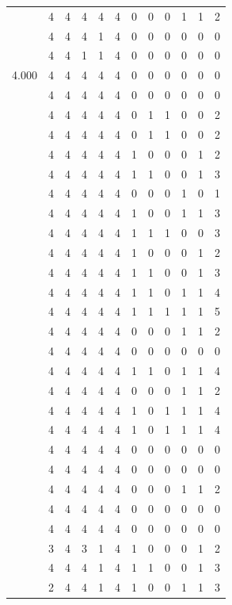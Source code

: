 \documentclass[]{msu-thesis}
\theoremstyle{definition}
\theoremstyle{definition}
\theoremstyle{definition}
\theoremstyle{remark}
\begin{document}
\begin{table}
{\begin{tabular}[t]{rrrrrrrrrrrr}
 & 4 & 4 & 4 & 4 & 4 & 0 & 0 & 0 & 1 & 1 & 2\\
 & 4 & 4 & 4 & 1 & 4 & 0 & 0 & 0 & 0 & 0 & 0\\
 & 4 & 4 & 1 & 1 & 4 & 0 & 0 & 0 & 0 & 0 & 0\\
4.000 & 4 & 4 & 4 & 4 & 4 & 0 & 0 & 0 & 0 & 0 & 0\\
 & 4 & 4 & 4 & 4 & 4 & 0 & 0 & 0 & 0 & 0 & 0\\
 & 4 & 4 & 4 & 4 & 4 & 0 & 1 & 1 & 0 & 0 & 2\\
 & 4 & 4 & 4 & 4 & 4 & 0 & 1 & 1 & 0 & 0 & 2\\
 & 4 & 4 & 4 & 4 & 4 & 1 & 0 & 0 & 0 & 1 & 2\\
 & 4 & 4 & 4 & 4 & 4 & 1 & 1 & 0 & 0 & 1 & 3\\
 & 4 & 4 & 4 & 4 & 4 & 0 & 0 & 0 & 1 & 0 & 1\\
 & 4 & 4 & 4 & 4 & 4 & 1 & 0 & 0 & 1 & 1 & 3\\
 & 4 & 4 & 4 & 4 & 4 & 1 & 1 & 1 & 0 & 0 & 3\\
 & 4 & 4 & 4 & 4 & 4 & 1 & 0 & 0 & 0 & 1 & 2\\
 & 4 & 4 & 4 & 4 & 4 & 1 & 1 & 0 & 0 & 1 & 3\\
 & 4 & 4 & 4 & 4 & 4 & 1 & 1 & 0 & 1 & 1 & 4\\
 & 4 & 4 & 4 & 4 & 4 & 1 & 1 & 1 & 1 & 1 & 5\\
 & 4 & 4 & 4 & 4 & 4 & 0 & 0 & 0 & 1 & 1 & 2\\
 & 4 & 4 & 4 & 4 & 4 & 0 & 0 & 0 & 0 & 0 & 0\\
 & 4 & 4 & 4 & 4 & 4 & 1 & 1 & 0 & 1 & 1 & 4\\
 & 4 & 4 & 4 & 4 & 4 & 0 & 0 & 0 & 1 & 1 & 2\\
 & 4 & 4 & 4 & 4 & 4 & 1 & 0 & 1 & 1 & 1 & 4\\
 & 4 & 4 & 4 & 4 & 4 & 1 & 0 & 1 & 1 & 1 & 4\\
 & 4 & 4 & 4 & 4 & 4 & 0 & 0 & 0 & 0 & 0 & 0\\
 & 4 & 4 & 4 & 4 & 4 & 0 & 0 & 0 & 0 & 0 & 0\\
 & 4 & 4 & 4 & 4 & 4 & 0 & 0 & 0 & 1 & 1 & 2\\
 & 4 & 4 & 4 & 4 & 4 & 0 & 0 & 0 & 0 & 0 & 0\\
 & 4 & 4 & 4 & 4 & 4 & 0 & 0 & 0 & 0 & 0 & 0\\
 & 3 & 4 & 3 & 1 & 4 & 1 & 0 & 0 & 0 & 1 & 2\\
 & 4 & 4 & 4 & 1 & 4 & 1 & 1 & 0 & 0 & 1 & 3\\
 & 2 & 4 & 4 & 1 & 4 & 1 & 0 & 0 & 1 & 1 & 3\\

\end{tabular}}
\end{table}
\end{document}
